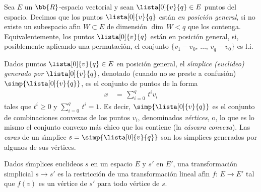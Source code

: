 \theoremstyle{plain}

\theoremstyle{remark}


Sea $E$ un $\bb{R}$-espacio vectorial y sean $\lista[0]{v}{q}\in E$ puntos
del espacio. Decimos que los puntos $\lista[0]{v}{q}$ est\'{a}n
\emph{en posici\'{o}n general}, si no existe un subespacio af\'{\i}n
$W\subset E$ de dimensi\'{o}n $\dim\,W<q$ que los contenga. Equivalentemente,
los puntos $\lista[0]{v}{q}$ est\'{a}n en posici\'{o}n general, si,
posiblemente aplicando una permutaci\'{o}n, el conjunto
$\{v_{1}-v_{0},\,\dots,\,v_{q}-v_{0}\}$ es l.i.

Dados puntos $\lista[0]{v}{q}\in E$ en posici\'{o}n general, el
\emph{s\'{\i}mplice (euclideo) generado por $\lista[0]{v}{q}$}, denotado
(cuando no se preste a confusi\'{o}n) $\simp{\lista[0]{v}{q}}$, es el
conjunto de puntos de la forma
\begin{align*}
	x & \,=\,\sum_{i=0}^{q}\,t^{i}v_{i}
\end{align*}
%
tales que $t^{i}\geq 0$ y $\sum_{i=0}^{q}\,t^{i}=1$. Es decir,
$\simp{\lista[0]{v}{q}}$ es el conjunto de combinaciones convexas de los
puntos $v_{i}$, denominados \emph{v\'{e}rtices}, o, lo que es lo mismo
el conjunto convexo m\'{a}s chico que los contiene (la \emph{c\'{a}scara %
convexa}). Las \emph{caras} de un s\'{\i}mplice
$s=\simp{\lista[0]{v}{q}}$ son los s\'{\i}mplices generados por algunos
de sus v\'{e}rtices.

Dados s\'{\i}mplices euclideos $s$ en un espacio $E$ y $s'$ en $E'$, una
transformaci\'{o}n simplicial $s\rightarrow s'$ es la restricci\'{o}n de una
transformaci\'{o}n lineal af\'{\i}n $f:\,E\rightarrow E'$ tal que
$f(v)$ es un v\'{e}rtice de $s'$ para todo v\'{e}rtice de $s$.
